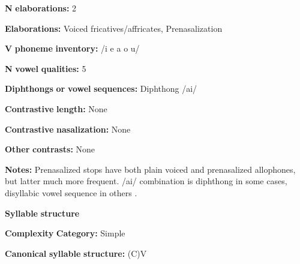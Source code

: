 \documentclass[output=paper]{langsci/langscibook}
\begin{document}
\begin{styleBody}
\textbf{N} \textbf{elaborations:} 2
\end{styleBody}

\begin{styleBody}
\textbf{Elaborations:} Voiced fricatives/affricates, Prenasalization
\end{styleBody}

\begin{styleBody}
\textbf{V} \textbf{phoneme} \textbf{inventory:} /i e a o u/
\end{styleBody}

\begin{styleBody}
\textbf{N} \textbf{vowel} \textbf{qualities:} 5
\end{styleBody}

\begin{styleBody}
\textbf{Diphthongs} \textbf{or} \textbf{vowel} \textbf{sequences:} Diphthong /ai/
\end{styleBody}

\begin{styleBody}
\textbf{Contrastive} \textbf{length:} None
\end{styleBody}

\begin{styleBody}
\textbf{Contrastive} \textbf{nasalization:} None
\end{styleBody}

\begin{styleBody}
\textbf{Other} \textbf{contrasts:} None
\end{styleBody}

\begin{styleBody}
\textbf{Notes:} Prenasalized stops have both plain voiced and prenasalized allophones, but latter much more frequent. /ai/ combination is diphthong in some cases, disyllabic vowel sequence in others \citep[22]{Wegener2008}.
\end{styleBody}

\begin{styleBody}
\textbf{Syllable} \textbf{structure}
\end{styleBody}

\begin{styleBody}
\textbf{Complexity} \textbf{Category:} Simple
\end{styleBody}

\begin{styleBody}
\textbf{Canonical} \textbf{syllable} \textbf{structure:} (C)V \citep[23-4]{Wegener2008}
\end{styleBody}
\end{document}
